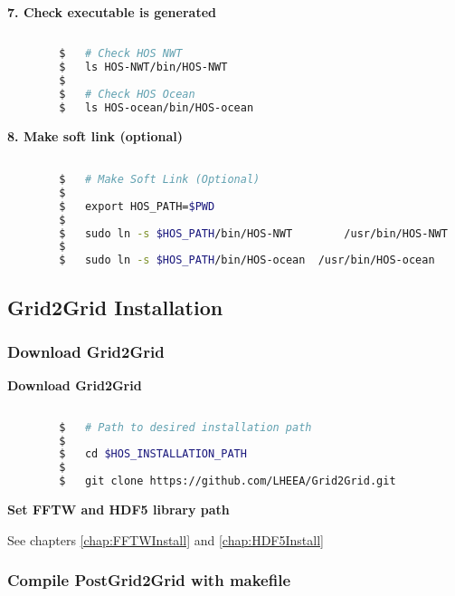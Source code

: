 		\vspace{0.2cm}
		\textbf{7. Check executable is generated}
		
		\begin{lstlisting}[language=bash]
		
		$	# Check HOS NWT
		$	ls HOS-NWT/bin/HOS-NWT
		$
		$	# Check HOS Ocean
		$	ls HOS-ocean/bin/HOS-ocean
		\end{lstlisting}
		
		\vspace{0.2cm}
		\textbf{8. Make soft link (optional)}
		
		\begin{lstlisting}[language=bash]

		$	# Make Soft Link (Optional)
		$
		$	export HOS_PATH=$PWD
		$
		$	sudo ln -s $HOS_PATH/bin/HOS-NWT		/usr/bin/HOS-NWT
		$
		$	sudo ln -s $HOS_PATH/bin/HOS-ocean	/usr/bin/HOS-ocean
		\end{lstlisting}

		\pagebreak
		\subsection{Grid2Grid Installation}
		
		\label{chap:Grid2GridInstall}
		
		\subsubsection{Download Grid2Grid}
		
		\textbf{Download Grid2Grid}
		
		\begin{lstlisting}[language=bash]
		
		$	# Path to desired installation path
		$
		$	cd $HOS_INSTALLATION_PATH
		$
		$	git clone https://github.com/LHEEA/Grid2Grid.git
		\end{lstlisting}
		
		\vspace{0.2cm}
		
		\textbf{Set FFTW and HDF5 library path}
		
		See chapters \ref{chap:FFTWInstall} and \ref{chap:HDF5Install}
		
		\subsubsection{Compile PostGrid2Grid with makefile}
		
		\vspace{1em}
		
